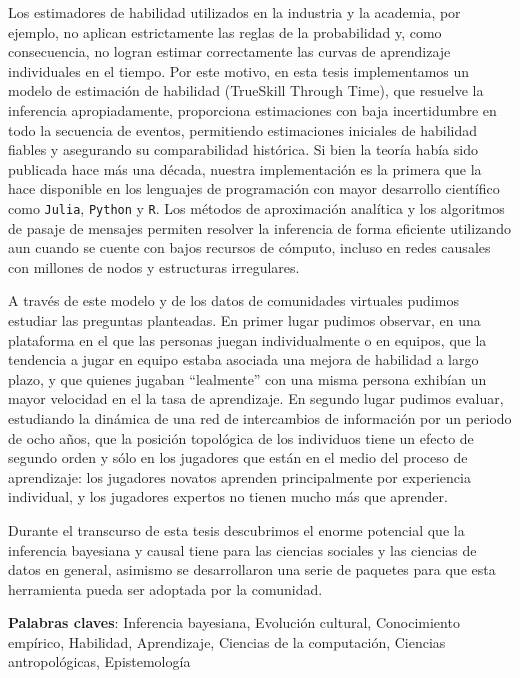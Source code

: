 \documentclass[a4paper,10pt]{book}
\theoremstyle{definition}
\begin{document}
Los estimadores de habilidad utilizados en la industria y la academia, por ejemplo, no aplican estrictamente las reglas de la probabilidad y, como consecuencia, no logran estimar correctamente las curvas de aprendizaje individuales en el tiempo.
Por este motivo, en esta tesis implementamos un modelo de estimaci\'on de habilidad (TrueSkill Through Time), que resuelve la inferencia apropiadamente, proporciona estimaciones con baja incertidumbre en todo la secuencia de eventos, permitiendo estimaciones iniciales de habilidad fiables y asegurando su comparabilidad hist\'orica.
Si bien la teor\'ia hab\'ia sido publicada hace más una década, nuestra implementaci\'on es la primera que la hace disponible en los lenguajes de programaci\'on con mayor desarrollo cient\'ifico como \texttt{Julia}, \texttt{Python} y \texttt{R}.
Los métodos de aproximaci\'on anal\'itica y los algoritmos de pasaje de mensajes permiten resolver la inferencia de forma eficiente utilizando aun cuando se cuente con bajos recursos de c\'omputo, incluso en redes causales con millones de nodos y estructuras irregulares.

A trav\'es de este modelo y de los datos de comunidades virtuales pudimos estudiar las preguntas planteadas.
En primer lugar pudimos observar, en una plataforma en el que las personas juegan individualmente o en equipos, que la tendencia a jugar en equipo estaba asociada una mejora de habilidad a largo plazo, y que quienes jugaban ``lealmente'' con una misma persona exhib\'ian un mayor velocidad en el la tasa de aprendizaje.
En segundo lugar pudimos evaluar, estudiando la dinámica de una red de intercambios de informaci\'on por un periodo de ocho años, que la posici\'on topol\'ogica de los individuos tiene un efecto de segundo orden y s\'olo en los jugadores que están en el medio del proceso de aprendizaje: los jugadores novatos aprenden principalmente por experiencia individual, y los jugadores expertos no tienen mucho más que aprender.

Durante el transcurso de esta tesis descubrimos el enorme potencial que la inferencia bayesiana y causal tiene para las ciencias sociales y las ciencias de datos en general, asimismo se desarrollaron una serie de paquetes para que esta herramienta pueda ser adoptada por la comunidad.

\vspace{0.3cm}

\noindent \textbf{Palabras claves}: Inferencia bayesiana, Evoluci\'on cultural, Conocimiento emp\'irico, Habilidad, Aprendizaje, Ciencias de la computaci\'on, Ciencias antropol\'ogicas, Epistemolog\'ia
\end{document}

